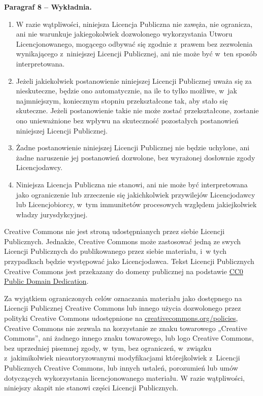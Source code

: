 \documentclass[oneside,polish,11pt,rmheadings]{mwbk}
\begin{document}
\textbf{Paragraf 8 – Wykładnia.} 
\begin{enumerate}
\item  W razie wątpliwości, niniejsza Licencja Publiczna nie zawęża, nie ogranicza, ani nie warunkuje jakiegokolwiek dozwolonego wykorzystania Utworu Licencjonowanego, mogącego odbywać się zgodnie z~prawem bez zezwolenia wynikającego z~niniejszej Licencji Publicznej, ani nie może być w~ten sposób interpretowana.  
\item  Jeżeli jakiekolwiek postanowienie niniejszej Licencji Publicznej uważa się za nieskuteczne, będzie ono automatycznie, na ile to tylko możliwe, w~jak najmniejszym, koniecznym stopniu przekształcone tak, aby stało się skuteczne. Jeżeli postanowienie takie nie może zostać przekształcone, zostanie ono unieważnione bez wpływu na skuteczność pozostałych postanowień niniejszej Licencji Publicznej.  
\item  Żadne postanowienie niniejszej Licencji Publicznej nie będzie uchylone, ani żadne naruszenie jej postanowień dozwolone, bez wyrażonej dosłownie zgody Licencjodawcy.  
\item  Niniejsza Licencja Publiczna nie stanowi, ani nie może być interpretowana jako ograniczenie lub zrzeczenie się jakichkolwiek przywilejów Licencjodawcy lub Licencjobiorcy, w~tym immunitetów procesowych względem jakiejkolwiek władzy jurysdykcyjnej.  
\end{enumerate}

Creative Commons nie jest stroną udostępnianych przez siebie Licencji Publicznych. Jednakże, Creative Commons może zastosować jedną ze swych Licencji Publicznych do publikowanego przez siebie materiału, i~w tych przypadkach będzie występować jako Licencjodawca. Tekst Licencji Publicznych Creative Commons jest przekazany do domeny publicznej na podstawie \href{https://creativecommons.org/publicdomain/zero/1.0/legalcode.pl}{CC0 Public Domain Dedication}. 

Za wyjątkiem ograniczonych celów oznaczania materiału jako dostępnego na Licencji Publicznej Creative Commons lub innego użycia dozwolonego przez polityki Creative Commons udostępnione na \href{https://creativecommons.org/policies}{creativecommons.org/policies}, Creative Commons nie zezwala na korzystanie ze znaku towarowego „Creative Commons”, ani żadnego innego znaku towarowego, lub logo Creative Commons, bez uprzedniej pisemnej zgody, w~tym, bez ograniczeń, w~związku z~jakimikolwiek nieautoryzowanymi modyfikacjami którejkolwiek z~Licencji Publicznych Creative Commons, lub innych ustaleń, porozumień lub umów dotyczących wykorzystania licencjonowanego materiału. W razie wątpliwości, niniejszy akapit nie stanowi części Licencji Publicznych. 
\end{document}
